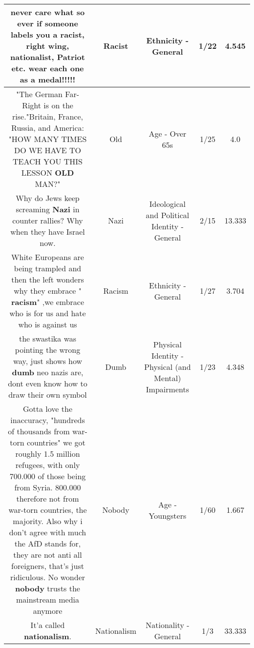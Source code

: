\documentclass[11pt]{article}
\newlength\mylength
\begin{document}
\begin{center}
\begin{longtable}{|C{.65\mylength}|C{.30\mylength}|C{.12\mylength}|C{.12\mylength}|C{.12\mylength}|}
  \small never care what so ever if someone labels you a \textbf{racist}, right wing,  nationalist, Patriot etc.  wear each one as a medal!!!!!\normalsize   & Racist & Ethnicity - General & 1/22 & 4.545 \\  \hline
  \small "The German Far-Right is on the rise."Britain, France, Russia, and America: "HOW MANY TIMES DO WE HAVE TO TEACH YOU THIS LESSON \textbf{OLD} MAN?"\normalsize   & Old & Age - Over 65s & 1/25 & 4.0 \\  \hline
  \small Why do Jews keep screaming \textbf{Nazi} in counter rallies? Why when they have Israel now.\normalsize   & Nazi &  Ideological and Political Identity - General & 2/15 & 13.333 \\  \hline
  \small White Europeans are being trampled and then the left wonders why they embrace " \textbf{racism}" ,we embrace who is for us and hate who is against us\normalsize   & Racism & Ethnicity - General & 1/27 & 3.704 \\  \hline
  \small the swastika was pointing the wrong way, just shows how \textbf{dumb} neo nazis are, dont even know how to draw their own symbol\normalsize   & Dumb & Physical Identity - Physical (and Mental) Impairments & 1/23 & 4.348 \\  \hline
  \small Gotta love the inaccuracy, "hundreds of thousands from war-torn countries" we got roughly 1.5 million refugees, with only 700.000 of those being from Syria. 800.000 therefore not from war-torn countries, the majority. Also why i don't agree with much the AfD stands for, they are not anti all foreigners, that's just ridiculous. No wonder \textbf{nobody} trusts the mainstream media anymore\normalsize   & Nobody & Age - Youngsters & 1/60 & 1.667 \\  \hline
  \small It'a called \textbf{nationalism}.\normalsize   & Nationalism & Nationality - General & 1/3 & 33.333 \\  \hline

\end{longtable}
\end{center}
\end{document}
